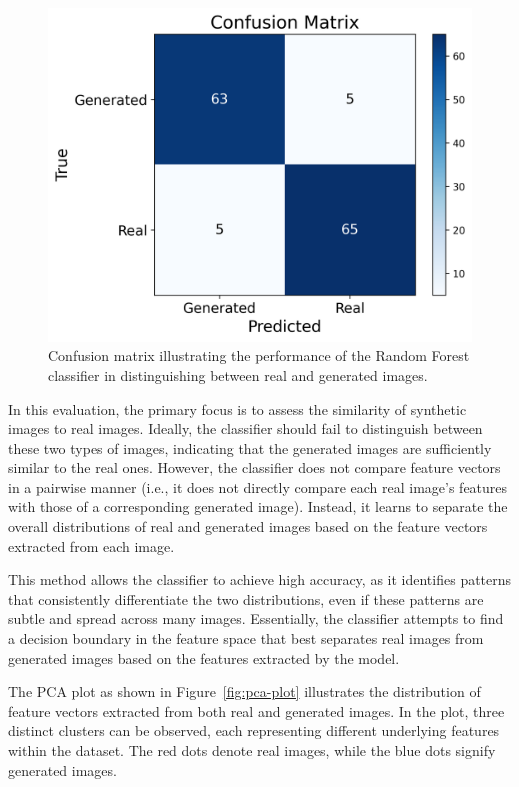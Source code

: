 \documentclass[12pt,DIV14,BCOR12mm,a4paper,footinclude=false,headinclude,parskip=half-,twoside,openright,cleardoublepage=empty,toc=index,bibliography=totoc,listof=totoc]{scrreprt}
\numberwithin{equation}{chapter}
\begin{document}
\begin{figure}
    \centering
    \includegraphics[scale=0.7]{../media/confusion_matrix.png}
    \caption{Confusion matrix illustrating the performance of the Random Forest classifier in distinguishing between real and generated images.}
    \label{fig:confusion-matrix}
\end{figure}

In this evaluation, the primary focus is to assess the similarity of synthetic images to real images. Ideally, the classifier should fail to distinguish between these two types of images, indicating that the generated images are sufficiently similar to the real ones. However, the classifier does not compare feature vectors in a pairwise manner (i.e., it does not directly compare each real image's features with those of a corresponding generated image). Instead, it learns to separate the overall distributions of real and generated images based on the feature vectors extracted from each image.

This method allows the classifier to achieve high accuracy, as it identifies patterns that consistently differentiate the two distributions, even if these patterns are subtle and spread across many images. Essentially, the classifier attempts to find a decision boundary in the feature space that best separates real images from generated images based on the features extracted by the model.

The PCA plot as shown in Figure~\ref{fig:pca-plot} illustrates the distribution of feature vectors extracted from both real and generated images. In the plot, three distinct clusters can be observed, each representing different underlying features within the dataset. The red dots denote real images, while the blue dots signify generated images.
\end{document}
